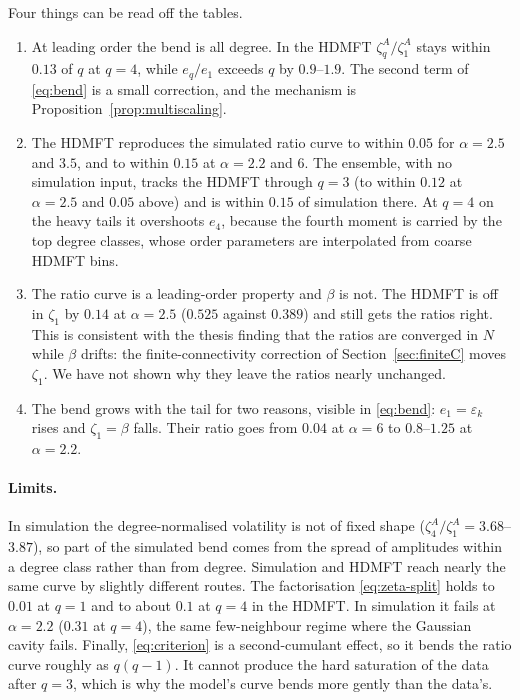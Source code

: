 \documentclass[11pt]{article}
\theoremstyle{remark}
\begin{document}
Four things can be read off the tables.
\begin{enumerate}
  \item At leading order the bend is all degree.  In the HDMFT $\zeta_q^A/\zeta_1^A$ stays within
        $0.13$ of $q$ at $q=4$, while $e_q/e_1$ exceeds $q$ by $0.9$--$1.9$.  The second term of
        \eqref{eq:bend} is a small correction, and the mechanism is Proposition~\ref{prop:multiscaling}.
  \item The HDMFT reproduces the simulated ratio curve to within $0.05$ for $\alpha=2.5$ and
        $3.5$, and to within $0.15$ at $\alpha=2.2$ and $6$.  The ensemble, with no simulation
        input, tracks the HDMFT through $q=3$ (to within $0.12$ at $\alpha=2.5$ and $0.05$
        above) and is within $0.15$ of simulation there.  At $q=4$ on the heavy tails it
        overshoots $e_4$, because the fourth moment is carried by the top degree classes, whose
        order parameters are interpolated from coarse HDMFT bins.
  \item The ratio curve is a leading-order property and $\beta$ is not.  The HDMFT is off in
        $\zeta_1$ by $0.14$ at $\alpha=2.5$ ($0.525$ against $0.389$) and still gets the ratios
        right.  This is consistent with the thesis finding that the ratios are converged in $N$
        while $\beta$ drifts: the finite-connectivity correction of Section~\ref{sec:finiteC}
        moves $\zeta_1$.  We have not shown why they leave the ratios nearly unchanged.
  \item The bend grows with the tail for two reasons, visible in \eqref{eq:bend}: $e_1=
        \varepsilon_k$ rises and $\zeta_1=\beta$ falls.  Their ratio goes from $0.04$ at
        $\alpha=6$ to $0.8$--$1.25$ at $\alpha=2.2$.
\end{enumerate}

\paragraph{Limits.}
In simulation the degree-normalised volatility is not of fixed shape ($\zeta_4^A/\zeta_1^A=
3.68$--$3.87$), so part of the simulated bend comes from the spread of amplitudes within a degree class
rather than from degree.  Simulation and HDMFT reach nearly the same curve by slightly different routes.
The factorisation \eqref{eq:zeta-split} holds to $0.01$ at $q=1$ and to about $0.1$ at $q=4$ in
the HDMFT.  In simulation it fails at $\alpha=2.2$ ($0.31$ at $q=4$), the same few-neighbour
regime where the Gaussian cavity fails.  Finally, \eqref{eq:criterion} is a second-cumulant
effect, so it bends the ratio curve roughly as $q(q-1)$.  It cannot produce the hard saturation
of the data after $q=3$, which is why the model's curve bends more gently than the data's.
\end{document}
